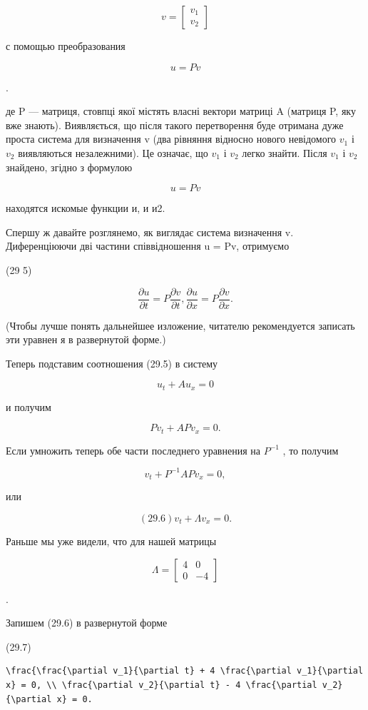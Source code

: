 \documentclass[
  ukrainian,
]{article}
\begin{document}
\[
v =
\begin{bmatrix} v_1 \\ v_2 \end{bmatrix}
\]

с помощью преобразования

\[
u = Pv
\]

.

де P --- матриця, стовпці якої містять власні вектори матриці A (матриця
P, яку вже знають). Виявляється, що після такого перетворення буде
отримана дуже проста система для визначення v (два рівняння відносно
нового невідомого \(v_1\) і \(v_2\) виявляються незалежними). Це
означає, що \(v_1\) і \(v_2\) легко знайти. Після \(v_1\) і \(v_2\)
знайдено, згідно з формулою

\[
u = Pv
\]

находятся искомые функции и, и и2.

Спершу ж давайте розглянемо, як виглядає система визначення v.
Диференціюючи дві частини співвідношення u = Pv, отримуємо

(29 5)

\[
\frac{\partial u}{\partial t} = P \frac{\partial v}{\partial t},
\frac{\partial u}{\partial x} = P \frac{\partial v}{\partial x}.
\]

(Чтобы лучше понять дальнейшее изложение, читателю рекомендуется
записать эти уравнен я в развернутой форме.)

Теперь подставим соотношения (29.5) в систему

\[
u_t + Au_x = 0
\]

и получим

\[
Pv_t + APv_x = 0.
\]

Если умножить теперь обе части последнего уравнения на \(P^{-1}\) , то
получим

\[
v_t + P^{-1}APv_x = 0,
\]

или

\[
(29.6) v_t + \Lambda v_x = 0.
\]

Раньше мы уже видели, что для нашей матрицы

\[
\Lambda =
\begin{bmatrix} 4 & 0 \\ 0 & -4 \end{bmatrix}
\]

.

Запишем (29.6) в развернутой форме

(29.7)

\begin{verbatim}
\frac{\frac{\partial v_1}{\partial t} + 4 \frac{\partial v_1}{\partial x} = 0, \\ \frac{\partial v_2}{\partial t} - 4 \frac{\partial v_2}{\partial x} = 0.
\end{verbatim}
\end{document}
